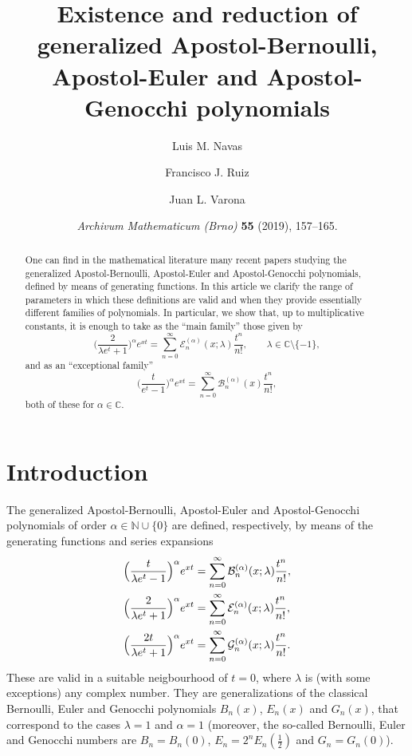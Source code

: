 \documentclass[11pt,a4paper]{amsart}
\date{\textit{Archivum Mathematicum (Brno)} \textbf{55} (2019), 157--165.}
\title[Existence and reduction of polynomials]
{Existence and reduction of generalized Apostol-Bernoulli, Apostol-Euler and Apostol-Genocchi polynomials}
\author[L.~M.~Navas]{Luis M. Navas}
\author[F.~J.~Ruiz]{Francisco J. Ruiz}
\author[J.~L.~Varona]{Juan L. Varona}
\newcommand{\N}{\mathbb{N}}
\newcommand{\C}{\mathbb{C}}
\newcommand{\B}[1][]{\mathcal{B}\ifx#1\empty\else^{(#1)}\fi}
\newcommand{\E}[1][]{\mathcal{E}\ifx#1\empty\else^{(#1)}\fi}
\newcommand{\G}[1][]{\mathcal{G}\ifx#1\empty\else^{(#1)}\fi}
\theoremstyle{plain}
\theoremstyle{plain}
\theoremstyle{plain}
\begin{document}


\begin{abstract}
One can find in the mathematical literature many recent papers studying the generalized Apostol-Bernoulli, Apostol-Euler and Apostol-Genocchi polynomials, defined by means of generating functions. In this article we clarify the range of parameters in which these definitions are valid 
and when they provide essentially different families of polynomials. In particular, we show that, up to multiplicative constants, it is enough to take as the ``main family'' those given by
\[
  \Big( \frac{2}{\lambda e^t+1} \Big)^\alpha e^{xt} 
  = \sum_{n=0}^{\infty} \mathcal{E}^{(\alpha)}_{n}(x;\lambda) \frac{t^n}{n!}, 
  \qquad \lambda \in \C \setminus \{-1\},
\]
and as an ``exceptional family''
\[
  \Big( \frac{t}{e^t-1} \Big)^\alpha e^{xt} 
  = \sum_{n=0}^{\infty} \mathcal{B}^{(\alpha)}_{n}(x) \frac{t^n}{n!},
\]
both of these for $\alpha \in \C$.
\end{abstract}


\maketitle

\section{Introduction}


The generalized Apostol-Bernoulli, Apostol-Euler and Apostol-Genocchi polynomials of order $\alpha \in \N \cup \{0\}$ are defined, respectively, by means of the generating functions and series expansions
\begin{align}
\label{eq:Beraln}
  \Big( \frac{t}{\lambda e^t-1} \Big)^\alpha e^{xt} &= \sum_{n=0}^{\infty} \B[\alpha]_{n}(x;\lambda) \frac{t^n}{n!}, \\
\label{eq:Eulaln}
  \Big( \frac{2}{\lambda e^t+1} \Big)^\alpha e^{xt} &= \sum_{n=0}^{\infty} \E[\alpha]_{n}(x;\lambda) \frac{t^n}{n!}, \\
\label{eq:Genaln}
  \Big( \frac{2t}{\lambda e^t+1} \Big)^\alpha e^{xt} &= \sum_{n=0}^{\infty} \G[\alpha]_{n}(x;\lambda) \frac{t^n}{n!}. 
\end{align}
These are valid in a suitable neigbourhood of $t=0$, where $\lambda$ is (with some exceptions) any complex number.  
They are generalizations of the classical Bernoulli, Euler and Genocchi polynomials $B_n(x)$, $E_n(x)$ and $G_n(x)$, that correspond to the cases $\lambda=1$ and $\alpha=1$ (moreover, the so-called Bernoulli, Euler and Genocchi numbers are $B_n = B_n(0)$, $E_n = 2^n E_n(\frac12)$ and $G_n = G_n(0)$). 
\end{document}
